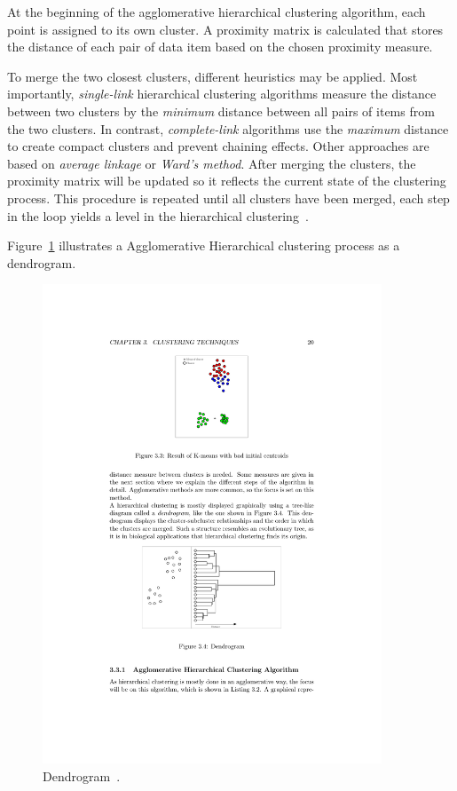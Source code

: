 \begin{itemize}
At the beginning of the agglomerative hierarchical clustering algorithm, each point is assigned to its own cluster. A proximity matrix is calculated that stores the distance of each pair of data item based on the chosen proximity measure.

To merge the two closest clusters, different heuristics may be applied. Most importantly, \textit{single-link} hierarchical clustering algorithms measure the distance between two clusters by the \textit{minimum} distance between all pairs of items from the two clusters. In contrast, \textit{complete-link} algorithms use the \textit{maximum} distance to create compact clusters and prevent chaining effects. Other approaches are based on \textit{average linkage} or \textit{Ward's method}. After merging the clusters, the proximity matrix will be updated so it reflects the current state of the clustering process. This procedure is repeated until all clusters have been merged, each step in the loop yields a level in the hierarchical clustering~\cite{Jain88clustering, Jain99clusterreview, Meert06clustermaps}.

Figure~\ref{fig:clustering-hierarchical-dendrogram} illustrates a Agglomerative Hierarchical clustering process as a dendrogram.

\begin{figure}[h]
  \begin{center}
    \includegraphics[width=0.9\textwidth]{figures/clustering_hierarchical_dendrogram.pdf}
    \caption{Dendrogram~\cite[p 20]{Meert06clustermaps}.}
    \label{fig:clustering-hierarchical-dendrogram}
  \end{center}
\end{figure}



\end{itemize}
